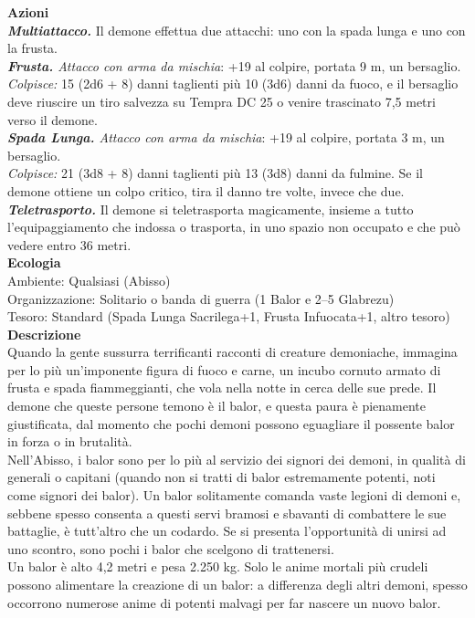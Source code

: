 \begin{multicols}{2}
\smallskip\textbf{Azioni}\\
\emph{\textbf{Multiattacco.}} Il demone effettua due attacchi: uno con la spada lunga e uno con la frusta.\\
\emph{\textbf{Frusta.} Attacco con arma da mischia}: +19 al colpire, portata 9 m, un bersaglio.\\
\emph{Colpisce:} 15 (2d6 + 8) danni taglienti più 10 (3d6) danni da fuoco, e il bersaglio deve riuscire un tiro salvezza su Tempra DC  25 o venire trascinato 7,5 metri verso il demone.\\
\emph{\textbf{Spada Lunga.} Attacco con arma da mischia}: +19 al colpire, portata 3 m, un bersaglio.\\
\emph{Colpisce:} 21 (3d8 + 8) danni taglienti più 13 (3d8) danni da fulmine. Se il demone ottiene un colpo critico, tira il danno tre volte, invece che due.\\
\emph{\textbf{Teletrasporto.}} Il demone si teletrasporta magicamente, insieme a tutto l'equipaggiamento che indossa o trasporta, in uno spazio non occupato e che può vedere entro 36 metri.\\
\textbf{Ecologia}\\
Ambiente: Qualsiasi (Abisso)\\
Organizzazione: Solitario o banda di guerra (1 Balor e 2–5 Glabrezu)\\
Tesoro: Standard (Spada Lunga Sacrilega+1, Frusta Infuocata+1, altro tesoro)\\
\textbf{Descrizione}\\
Quando la gente sussurra terrificanti racconti di creature demoniache, immagina per lo più un’imponente figura di fuoco e carne, un incubo cornuto armato di frusta e spada fiammeggianti, che vola nella notte in cerca delle sue prede. Il demone che queste persone temono è il balor, e questa paura è pienamente giustificata, dal momento che pochi demoni possono eguagliare il possente balor in forza o in brutalità.\\
Nell'Abisso, i balor sono per lo più al servizio dei signori dei demoni, in qualità di generali o capitani (quando non si tratti di balor estremamente potenti, noti come signori dei balor). Un balor solitamente comanda vaste legioni di demoni e, sebbene spesso consenta a questi servi bramosi e sbavanti di combattere le sue battaglie, è tutt’altro che un codardo. Se si presenta l'opportunità di unirsi ad uno scontro, sono pochi i balor che scelgono di trattenersi.\\
Un balor è alto 4,2 metri e pesa 2.250 kg. Solo le anime mortali più crudeli possono alimentare la creazione di un balor: a differenza degli altri demoni, spesso occorrono numerose anime di potenti malvagi per far nascere un nuovo balor.\\


\end{multicols}
